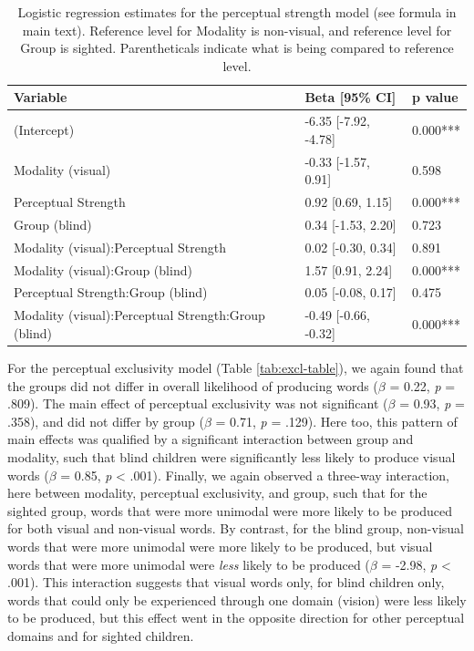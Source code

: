 \documentclass[
  man,floatsintext]{apa6}
\begin{document}
\begin{table}[H]

\caption{\label{tab:ps-table}Logistic regression estimates for the perceptual strength model (see formula in main text). Reference level for Modality is non-visual, and reference level for Group is sighted. Parentheticals indicate what is being compared to reference level.}
\centering
\begin{tabular}[t]{l|l|l}
\hline
Variable & Beta [95\% CI] & p value\\
\hline
(Intercept) & -6.35 [-7.92, -4.78] & 0.000***\\
\hline
Modality (visual) & -0.33 [-1.57, 0.91] & 0.598\\
\hline
Perceptual Strength & 0.92 [0.69, 1.15] & 0.000***\\
\hline
Group (blind) & 0.34 [-1.53, 2.20] & 0.723\\
\hline
Modality (visual):Perceptual Strength & 0.02 [-0.30, 0.34] & 0.891\\
\hline
Modality (visual):Group (blind) & 1.57 [0.91, 2.24] & 0.000***\\
\hline
Perceptual Strength:Group (blind) & 0.05 [-0.08, 0.17] & 0.475\\
\hline
Modality (visual):Perceptual Strength:Group (blind) & -0.49 [-0.66, -0.32] & 0.000***\\
\hline
\end{tabular}
\end{table}

For the perceptual exclusivity model (Table \ref{tab:excl-table}), we again found that the groups did not differ in overall likelihood of producing words (\(\beta\) = 0.22, \emph{p} = .809). The main effect of perceptual exclusivity was not significant (\(\beta\) = 0.93, \emph{p} = .358), and did not differ by group (\(\beta\) = 0.71, \emph{p} = .129). Here too, this pattern of main effects was qualified by a significant interaction between group and modality, such that blind children were significantly less likely to produce visual words (\(\beta\) = 0.85, \emph{p} \textless{} .001). Finally, we again observed a three-way interaction, here between modality, perceptual exclusivity, and group, such that for the sighted group, words that were more unimodal were more likely to be produced for both visual and non-visual words. By contrast, for the blind group, non-visual words that were more unimodal were more likely to be produced, but visual words that were more unimodal were \emph{less} likely to be produced (\(\beta\) = -2.98, \emph{p} \textless{} .001). This interaction suggests that visual words only, for blind children only, words that could only be experienced through one domain (vision) were less likely to be produced, but this effect went in the opposite direction for other perceptual domains and for sighted children.
\end{document}
